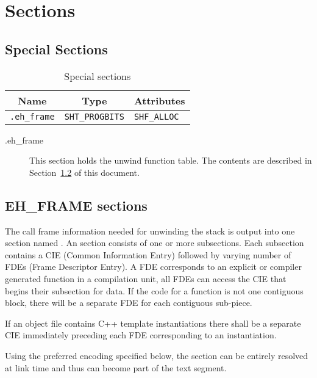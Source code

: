 \section{Sections}

\subsection{Special Sections}

\begin{table}[H]
\Hrule
  \caption{Special sections}
  \begin{center}
    \begin{tabular}[t]{l|l|l}
      \multicolumn{1}{c}{Name} & \multicolumn{1}{c}{Type}
       & \multicolumn{1}{c}{Attributes} \\
      \hline
      \texttt{.eh_frame} & \texttt{SHT_PROGBITS} & \texttt{SHF_ALLOC}
    \end{tabular}
  \end{center}
\Hrule
\end{table}

\begin{description}
 \item[.eh_frame] This section holds the unwind function table.
                      The contents are described in Section~\ref{sec_eh_frame}
                      of this document.
\end{description}

\subsection{EH\_FRAME sections}
\label{sec_eh_frame}

The call frame information needed for unwinding the stack is output into
one section named
.  An  section consists of one or more
subsections. Each subsection contains a CIE (Common Information Entry)
followed by varying number of FDEs (Frame Descriptor Entry). A FDE
corresponds to an explicit or compiler generated function in a
compilation unit, all FDEs can access the CIE that begins their
subsection for data.  If the code for a function is not one contiguous
block, there will be a separate FDE for each contiguous sub-piece.

If an object file contains C++ template instantiations there shall be
a separate CIE immediately preceding each FDE corresponding to an
instantiation.

Using the preferred encoding specified below, the  section can
be entirely resolved at link time and thus can become part of the
text segment.

